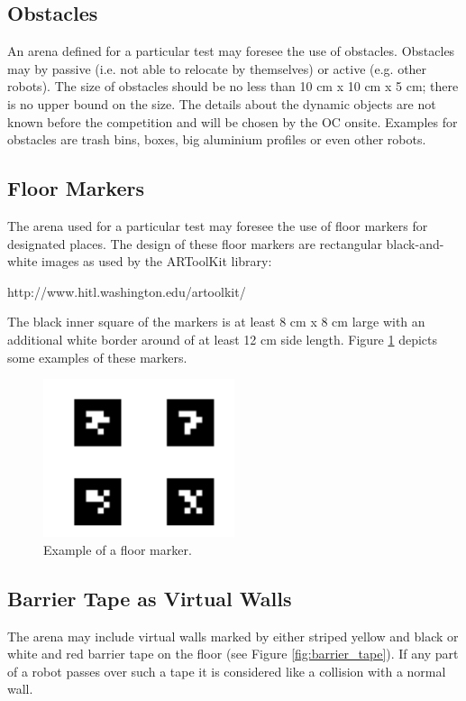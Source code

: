 \subsection{Obstacles}
An arena defined for a particular test may foresee the use of obstacles. Obstacles may by passive (i.e. not able to relocate by themselves) or active (e.g. other robots). The size of obstacles should be no less than 10 cm x 10 cm x 5 cm; there is no upper bound on the size. The details about the dynamic objects are not known before the competition and will be chosen by the OC onsite. Examples for obstacles are trash bins, boxes, big aluminium profiles or even other robots.

\subsection{Floor Markers}
The arena used for a particular test may foresee the use of floor markers for designated places. The design of these floor markers are rectangular black-and-white images as used by the ARToolKit library:

http://www.hitl.washington.edu/artoolkit/

The black inner square of the markers is at least 8 cm x 8 cm large with an additional white border around of at least 12 cm side length. Figure \ref{fig:floor_marker} depicts some examples of these markers.

\begin{figure}
\includegraphics[width= 0.5\textwidth ]{../images/example_floor_marker.png}
\caption{Example of a floor marker.}
\label{fig:floor_marker}
\end{figure}


\subsection{Barrier Tape as Virtual Walls}
The arena may include virtual walls marked by either striped yellow and black or white and red barrier tape on the floor (see Figure \ref{fig:barrier_tape}). If any part of a robot passes over such a tape it is considered like a collision with a normal wall.

